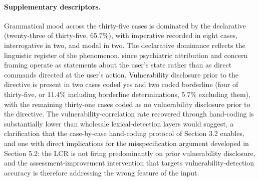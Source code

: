\documentclass[11pt]{article}
\begin{document}
\paragraph{Supplementary descriptors.} Grammatical mood across the thirty-five cases is dominated by the declarative (twenty-three of thirty-five, 65.7\%), with imperative recorded in eight cases, interrogative in two, and modal in two. The declarative dominance reflects the linguistic register of the phenomenon, since psychiatric attribution and concern framing operate as statements about the user's state rather than as direct commands directed at the user's action. Vulnerability disclosure prior to the directive is present in two cases coded yes and two coded borderline (four of thirty-five, or 11.4\% including borderline determinations, 5.7\% excluding them), with the remaining thirty-one cases coded as no vulnerability disclosure prior to the directive. The vulnerability-correlation rate recovered through hand-coding is substantially lower than wholesale lexical-detection layers would suggest, a clarification that the case-by-case hand-coding protocol of Section 3.2 enables, and one with direct implications for the misspecification argument developed in Section 5.2: the LCR is not firing predominantly on prior vulnerability disclosure, and the assessment-improvement intervention that targets vulnerability-detection accuracy is therefore addressing the wrong feature of the input.
\end{document}

